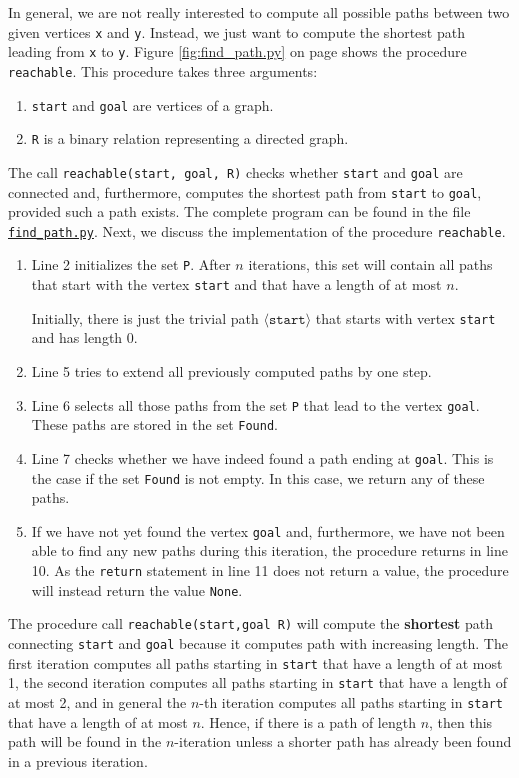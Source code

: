 In general, we are not really interested to compute all possible paths between two given vertices
\texttt{x} and \texttt{y}.  Instead, we just want to compute the shortest path leading from \texttt{x} to \texttt{y}.
Figure \ref{fig:find_path.py} on page \pageref{fig:find_path.py} shows the procedure \texttt{reachable}. 
This procedure takes three arguments:
\begin{enumerate}
\item \texttt{start} and \texttt{goal} are vertices of a graph.
\item \texttt{R} is a binary relation representing a directed graph.
\end{enumerate}
The call  \texttt{reachable(start, goal, R)} checks whether \texttt{start} and \texttt{goal} are connected and, furthermore,
computes the shortest path from \texttt{start} to \texttt{goal}, provided such a path exists.
The complete program can be found in the file
\href{https://github.com/karlstroetmann/Logik/blob/master/Python/find\_path.py}{\texttt{find\_path.py}}.
Next, we discuss the implementation of the procedure  \texttt{reachable}.
\begin{enumerate}
\item Line 2 initializes the set \texttt{P}.  After $n$ iterations, this set will contain all paths
      that start with the vertex \texttt{start} and that have a length of at most $n$.

      Initially, there is just the trivial path $\langle\texttt{start}\rangle$ that starts with vertex
      \texttt{start} and has length $0$.
\item Line 5 tries to extend all previously computed paths by one step.
\item Line 6 selects all those paths from the set \texttt{P} that lead to the vertex \texttt{goal}.
      These paths are stored in the set \texttt{Found}.
\item Line 7 checks whether we have indeed found a path ending at \texttt{goal}.  This is the case if
      the set \texttt{Found} is not empty.  
      In this case, we return any of these paths.
\item If we have not yet found the vertex \texttt{goal} and, furthermore, we have not been able to find
      any new paths during this iteration,  the procedure returns in line 10.
      As the \texttt{return} statement in line 11 does not return a value, the procedure will
      instead return the value \texttt{None}.
\end{enumerate}
The procedure call \texttt{reachable(start,goal R)} will compute the \textbf{shortest} path connecting
\texttt{start} and \texttt{goal} because it computes path with increasing length.  The first iteration
computes all paths starting in \texttt{start} that have a length of at most 1, the second iteration
computes all paths starting in \texttt{start} that have a length of at most 2, and in general the $n$-th
iteration computes all paths starting in \texttt{start} that have a length of at most $n$.  Hence, if
there is a path of length $n$, then this path will be found in the $n$-iteration unless a shorter path has
already been found in a previous iteration.  

